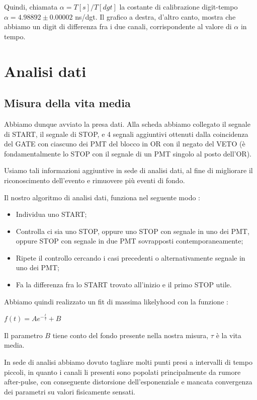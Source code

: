 \documentclass[10pt,a4paper]{article}
\begin{document}
Quindi, chiamata $\alpha = T[s]/T[dgt]$ la costante di calibrazione digit-tempo $\alpha = 4.98892 \pm 0.00002 $ ns/dgt. 
Il grafico a destra, d'altro canto, mostra che abbiamo un digit di differenza fra i due canali, corrispondente al valore di $\alpha$ in tempo.

\section{Analisi dati}

\subsection{Misura della vita media}

Abbiamo dunque avviato la presa dati. Alla scheda abbiamo collegato il segnale di START, il segnale di STOP, e 4 segnali aggiuntivi ottenuti dalla coincidenza del GATE con ciascuno dei PMT del blocco in OR con il negato del VETO (è fondamentalmente lo STOP con il segnale di un PMT singolo al posto dell'OR).

Usiamo tali informazioni aggiuntive in sede di analisi dati, al fine di migliorare il riconoscimento dell'evento e rimuovere più eventi di fondo. 

Il nostro algoritmo di analisi dati, funziona nel seguente modo :

\begin{itemize}
\item Individua uno START;
\item Controlla ci sia uno STOP, oppure uno STOP con segnale in uno dei PMT, oppure STOP con segnale in due PMT sovrapposti contemporaneamente;
\item Ripete il controllo cercando i casi precedenti o alternativamente segnale in uno dei PMT;
\item Fa la differenza fra lo START trovato all'inizio e il primo STOP utile.
\end{itemize}

Abbiamo quindi realizzato un fit di massima likelyhood con la funzione :
\begin{center}
$f(t) = Ae^{-\frac{t}{\tau}} + B$
\end{center}

Il parametro $B$ tiene conto del fondo presente nella nostra misura, $\tau$ è la vita media. 

In sede di analisi abbiamo dovuto tagliare molti punti presi a intervalli di tempo piccoli, in quanto i canali li presenti sono popolati principalmente da rumore after-pulse, con conseguente distorsione dell'esponenziale e mancata convergenza dei parametri su valori fisicamente sensati.
\end{document}
